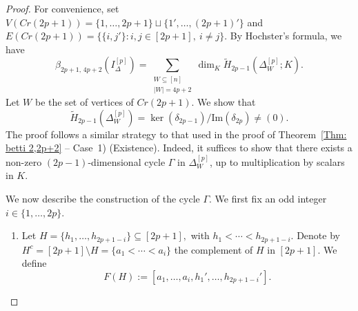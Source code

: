 \documentclass[12pt]{amsart}
\begin{document}
\begin{proof}
For convenience, set $V(Cr(2p+1))=\{1, \dots, 2p+1\}\sqcup\{1', \dots, (2p+1)'\}$ and 
$E(Cr(2p+1))=\{\{i,j'\}: i,j\in [2p+1],\ i\neq j\}$. By Hochster’s formula, we have
\[
\beta_{2p+1,\,4p+2}\!\left(I_{\Delta}^{[p]}\right) =
\sum_{\substack{W \subseteq [n] \\ |W| = 4p+2}}
\dim_K \widetilde{H}_{2p-1}(\Delta_W^{[p]}; K).
\]
Let $W$ be the set of vertices of $Cr(2p+1)$. We show that
\[
\widetilde{H}_{2p-1}(\Delta_W^{[p]})
= \ker(\delta_{2p-1}) / \mathrm{Im}(\delta_{2p}) \neq (0).
\]
The proof follows a similar strategy to that used in the proof of Theorem~\ref{Thm: betti 2,2p+2} -- Case~1) (Existence). Indeed, it suffices to show that there exists a non-zero $(2p-1)$-dimensional cycle $\Gamma$ in $\Delta_W^{[p]}$, up to multiplication by scalars in $K$.

We now describe the construction of the cycle $\Gamma$. We first fix an odd integer $i \in \{1, \dots, 2p\}$. %



\begin{enumerate}
\item Let $H=\{h_1,\ldots,h_{2p+1-i}\}\subseteq [2p+1],$ with $h_1<\cdots<h_{2p+1-i}.$ Denote by $H^c=[2p+1]\setminus H=\{a_1<\cdots<a_i\}$ the complement of $H$ in $[2p+1]$. We define
\[
F(H):=[a_1,\ldots,a_i,h_1',\ldots,h_{2p+1-i}'].
\]



\end{enumerate}
\end{proof}
\end{document}
